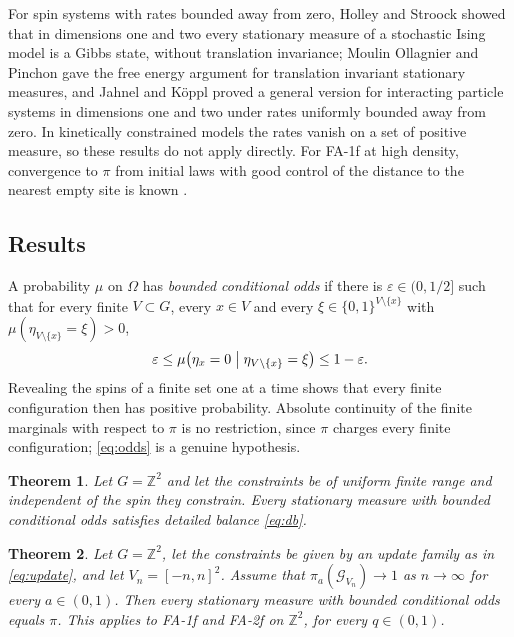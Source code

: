 \documentclass[11pt]{amsart}
\newtheorem{theorem}{Theorem}[section]
\theoremstyle{remark}
\newcommand{\Z}{\mathbb{Z}}
\begin{document}
For spin systems with rates bounded away from zero, Holley and Stroock \cite{HS77} showed that in dimensions one and
two every stationary measure of a stochastic Ising model is a Gibbs state, without translation invariance; Moulin
Ollagnier and Pinchon \cite{MOP77} gave the free energy argument for translation invariant stationary measures, and Jahnel and
K\"oppl \cite{JK25} proved a general version for interacting particle systems in dimensions one and two under rates
uniformly bounded away from zero. In kinetically constrained models the rates vanish on a set of positive measure, so
these results do not apply directly. For FA-1f at high density, convergence to $\pi$ from initial laws with good control
of the distance to the nearest empty site is known \cite{BCMRT13,MV19,HT25}.

\subsection{Results}
A probability $\mu$ on $\Omega$ has \emph{bounded conditional odds} if there is $\varepsilon\in(0,1/2]$ such that for
every finite $V\subset G$, every $x\in V$ and every $\xi\in\{0,1\}^{V\setminus\{x\}}$ with $\mu(\eta_{V\setminus\{x\}}=\xi)>0$,
\begin{equation}\label{eq:odds}
\varepsilon\le\mu\bigl(\eta_x=0\bigm|\eta_{V\setminus\{x\}}=\xi\bigr)\le1-\varepsilon.
\end{equation}
Revealing the spins of a finite set one at a time shows that every finite configuration then has positive probability.
Absolute continuity of the finite marginals with respect to $\pi$ is no restriction, since $\pi$ charges every finite
configuration; \eqref{eq:odds} is a genuine hypothesis.

\begin{theorem}\label{thm:balance}
Let $G=\Z^2$ and let the constraints be of uniform finite range and independent of the spin they constrain. Every
stationary measure with bounded conditional odds satisfies detailed balance \eqref{eq:db}.
\end{theorem}

\begin{theorem}\label{thm:identify}
Let $G=\Z^2$, let the constraints be given by an update family as in \eqref{eq:update}, and let $V_n=[-n,n]^2$.
Assume that $\pi_a(\mathcal G_{V_n})\to1$ as $n\to\infty$ for every $a\in(0,1)$. Then every stationary measure with
bounded conditional odds equals $\pi$. This applies to FA-1f and FA-2f on $\Z^2$, for every $q\in(0,1)$.
\end{theorem}
\end{document}

